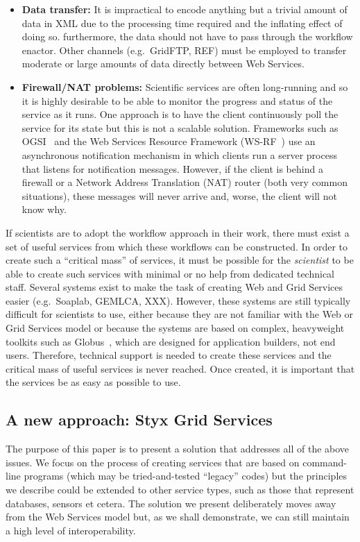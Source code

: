 \documentclass{llncs}
\begin{document}
\begin{itemize}
	\item {\bf Data transfer:} It is impractical to encode anything but a trivial amount of data in XML due to the processing time required and the inflating effect of doing so.  furthermore, the data should not have to pass through the workflow enactor.  Other channels (e.g.\ GridFTP, REF) must be employed to transfer moderate or large amounts of data directly between Web Services.
	\item {\bf Firewall/NAT problems:} Scientific services are often long-running and so it is highly desirable to be able to monitor the progress and status of the service as it runs.  One approach is to have the client continuously poll the service for its state but this is not a scalable solution.  Frameworks such as OGSI~\cite{ogsi} and the Web Services Resource Framework (WS-RF~\cite{wsrf}) use an asynchronous notification mechanism in which clients run a server process that listens for notification messages.  However, if the client is behind a firewall or a Network Address Translation (NAT) router (both very common situations), these messages will never arrive and, worse, the client will not know why.
\end{itemize}

If scientists are to adopt the workflow approach in their work, there must exist a set of useful services from which these workflows can be constructed.  In order to create such a ``critical mass'' of services, it must be possible for the {\em scientist\/} to be able to create such services with minimal or no help from dedicated technical staff.  Several systems exist to make the task of creating Web and Grid Services easier (e.g.\ Soaplab, GEMLCA, XXX).  However, these systems are still typically difficult for scientists to use, either because they are not familiar with the Web or Grid Services model or because the systems are based on complex, heavyweight toolkits such as Globus~\cite{globusalliance}, which are designed for application builders, not end users.  Therefore, technical support is needed to create these services and the critical mass of useful services is never reached.  Once created, it is important that the services be as easy as possible to use.

\subsection{A new approach: Styx Grid Services}
The purpose of this paper is to present a solution that addresses all of the above issues.  We focus on the process of creating services that are based on command-line programs (which may be tried-and-tested ``legacy'' codes) but the principles we describe could be extended to other service types, such as those that represent databases, sensors et cetera.  The solution we present deliberately moves away from the Web Services model but, as we shall demonstrate, we can still maintain a high level of interoperability.
\end{document}
